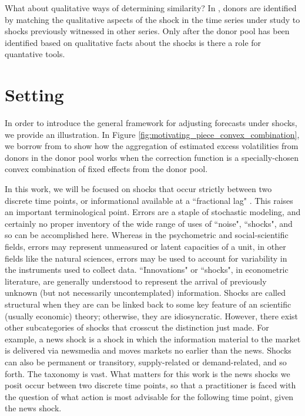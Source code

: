 \documentclass[11pt]{article}
\theoremstyle{definition}
\begin{document}
What about qualitative ways of determining similarity?  In \cite{lundquist2024volatility}, donors are identified by matching the qualitative aspects of the shock in the time series under study to shocks previously witnessed in other series.  Only after the donor pool has been identified based on qualitative facts about the shocks is there a role for quantative tools.

\section{Setting}\label{Setting}

In order to introduce the general framework for adjusting forecasts under shocks, we provide an illustration.  In Figure \ref{fig:motivating_piece_convex_combination}, we borrow from \cite{lundquist2024volatility} to show how the aggregation of estimated excess volatilities from donors in the donor pool works when the correction function is a specially-chosen convex combination of fixed effects from the donor pool.  

In this work, we will be focused on shocks that occur strictly between two discrete time points, or informational available at a ``fractional lag" \citep{castle2011forecasting}.  This raises an important terminological point.  Errors are a staple of stochastic modeling, and certainly no proper inventory of the wide range of uses of ``noise", ``shocks", and so can be accomplished here.  Whereas in the psychometric and social-scientific fields, errors may represent unmeasured or latent capacities of a unit, in other fields like the natural sciences, errors may be used to account for variability in the instruments used to collect data.  ``Innovations" or ``shocks", in econometric literature, are generally understood to represent the arrival of previously unknown (but not necessarily uncontemplated) information.  Shocks are called structural when they are can be linked back to some key feature of an scientific (usually economic) theory; otherwise, they are idiosyncratic.  However, there exist other subcategories of shocks that crosscut the distinction just made.  For example, a news shock is a shock in which the information material to the market is delivered via newsmedia and moves markets no earlier than the news.  Shocks can also be permanent or transitory, supply-related or demand-related, and so forth.  The taxonomy is vast.  What matters for this work is the news shocks we posit occur between two discrete time points, so that a practitioner is faced with the question of what action is most advisable for the following time point, given the news shock.
\end{document}
